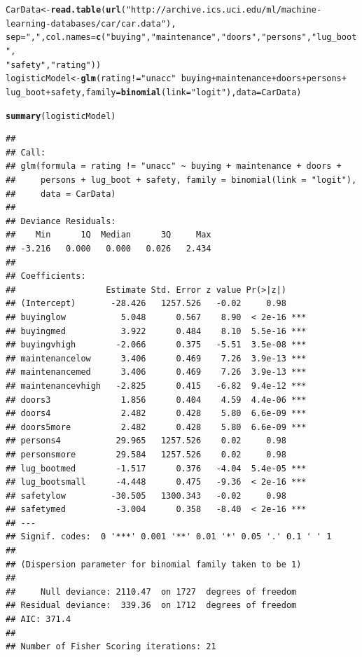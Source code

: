 \documentclass[12pt, a4paper, oneside]{article}\usepackage{graphicx, color}
\makeatletter
\newcommand{\hlfunctioncall}[1]{\textcolor[rgb]{0.501960784313725,0,0.329411764705882}{\textbf{#1}}}%
\newcommand{\hlstring}[1]{\textcolor[rgb]{0.6,0.6,1}{#1}}%
\newenvironment{kframe}{%
 \def\at@end@of@kframe{}%
 \ifinner\ifhmode%
  \def\at@end@of@kframe{\end{minipage}}%
  \begin{minipage}{\columnwidth}%
 \fi\fi%
 \def\FrameCommand##1{\hskip\@totalleftmargin \hskip-\fboxsep
 \colorbox{shadecolor}{##1}\hskip-\fboxsep
     \hskip-\linewidth \hskip-\@totalleftmargin \hskip\columnwidth}%
 \MakeFramed {\advance\hsize-\width
   \@totalleftmargin\z@ \linewidth\hsize
   \@setminipage}}%
 {\par\unskip\endMakeFramed%
 \at@end@of@kframe}
\newenvironment{knitrout}{}{} %
\makeatother
\begin{document}
\begin{knitrout}
\color{fgcolor}\begin{kframe}
\begin{alltt}
CarData <- \hlfunctioncall{read.table}(\hlfunctioncall{url}(\hlstring{"http://archive.ics.uci.edu/ml/machine-learning-databases/car/car.data"}), 
    sep = \hlstring{","}, col.names = \hlfunctioncall{c}(\hlstring{"buying"}, \hlstring{"maintenance"}, \hlstring{"doors"}, \hlstring{"persons"}, \hlstring{"lug_boot"}, 
        \hlstring{"safety"}, \hlstring{"rating"}))
logisticModel <- \hlfunctioncall{glm}(rating != \hlstring{"unacc"} ~ buying + maintenance + doors + persons + 
    lug_boot + safety, family = \hlfunctioncall{binomial}(link = \hlstring{"logit"}), data = CarData)
\end{alltt}


{\ttfamily\noindent\color{warningcolor}{\#\# Warning: glm.fit: fitted probabilities numerically 0 or 1 occurred}}\begin{alltt}
\hlfunctioncall{summary}(logisticModel)
\end{alltt}
\begin{verbatim}
## 
## Call:
## glm(formula = rating != "unacc" ~ buying + maintenance + doors + 
##     persons + lug_boot + safety, family = binomial(link = "logit"), 
##     data = CarData)
## 
## Deviance Residuals: 
##    Min      1Q  Median      3Q     Max  
## -3.216   0.000   0.000   0.026   2.434  
## 
## Coefficients:
##                  Estimate Std. Error z value Pr(>|z|)    
## (Intercept)       -28.426   1257.526   -0.02     0.98    
## buyinglow           5.048      0.567    8.90  < 2e-16 ***
## buyingmed           3.922      0.484    8.10  5.5e-16 ***
## buyingvhigh        -2.066      0.375   -5.51  3.5e-08 ***
## maintenancelow      3.406      0.469    7.26  3.9e-13 ***
## maintenancemed      3.406      0.469    7.26  3.9e-13 ***
## maintenancevhigh   -2.825      0.415   -6.82  9.4e-12 ***
## doors3              1.856      0.404    4.59  4.4e-06 ***
## doors4              2.482      0.428    5.80  6.6e-09 ***
## doors5more          2.482      0.428    5.80  6.6e-09 ***
## persons4           29.965   1257.526    0.02     0.98    
## personsmore        29.584   1257.526    0.02     0.98    
## lug_bootmed        -1.517      0.376   -4.04  5.4e-05 ***
## lug_bootsmall      -4.448      0.475   -9.36  < 2e-16 ***
## safetylow         -30.505   1300.343   -0.02     0.98    
## safetymed          -3.004      0.358   -8.40  < 2e-16 ***
## ---
## Signif. codes:  0 '***' 0.001 '**' 0.01 '*' 0.05 '.' 0.1 ' ' 1
## 
## (Dispersion parameter for binomial family taken to be 1)
## 
##     Null deviance: 2110.47  on 1727  degrees of freedom
## Residual deviance:  339.36  on 1712  degrees of freedom
## AIC: 371.4
## 
## Number of Fisher Scoring iterations: 21
\end{verbatim}
\end{kframe}
\end{knitrout}
\end{document}
